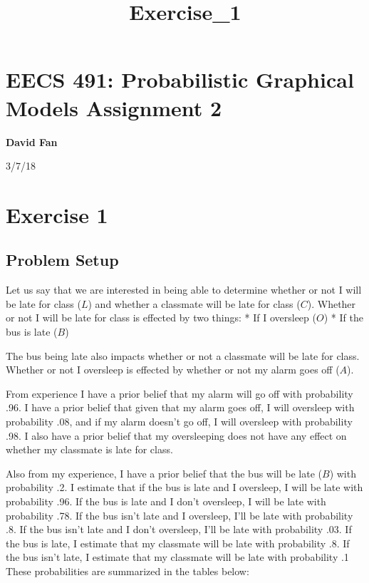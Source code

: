 \documentclass[11pt]{article}
\title{Exercise\_1}
\begin{document}
    
    
    \maketitle
    
    

    
    \section{EECS 491: Probabilistic Graphical Models Assignment
2}\label{eecs-491-probabilistic-graphical-models-assignment-2}

\textbf{David Fan}

3/7/18

\section{Exercise 1}\label{exercise-1}

    \subsection{Problem Setup}\label{problem-setup}

    Let us say that we are interested in being able to determine whether or
not I will be late for class (\(L\)) and whether a classmate will be
late for class (\(C\)). Whether or not I will be late for class is
effected by two things: * If I oversleep (\(O\)) * If the bus is late
(\(B\))

The bus being late also impacts whether or not a classmate will be late
for class. Whether or not I oversleep is effected by whether or not my
alarm goes off (\(A\)).

From experience I have a prior belief that my alarm will go off with
probability .96. I have a prior belief that given that my alarm goes
off, I will oversleep with probability .08, and if my alarm doesn't go
off, I will oversleep with probability .98. I also have a prior belief
that my oversleeping does not have any effect on whether my classmate is
late for class.

Also from my experience, I have a prior belief that the bus will be late
(\(B\)) with probability .2. I estimate that if the bus is late and I
oversleep, I will be late with probability .96. If the bus is late and I
don't oversleep, I will be late with probability .78. If the bus isn't
late and I oversleep, I'll be late with probability .8. If the bus isn't
late and I don't oversleep, I'll be late with probability .03. If the
bus is late, I estimate that my classmate will be late with probability
.8. If the bus isn't late, I estimate that my classmate will be late
with probability .1 These probabilities are summarized in the tables
below:
\end{document}
